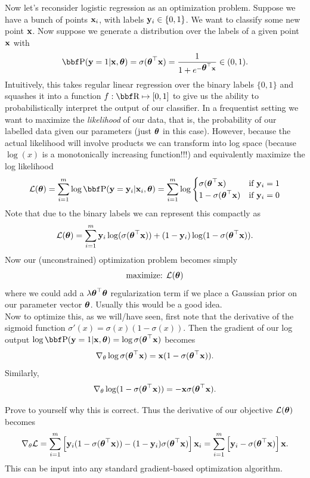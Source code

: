 \documentclass{article}
\begin{document}
Now let's reconsider logistic regression as an optimization problem.
Suppose we have a bunch of points ${\bf x}_i$, with labels ${\bf y}_i \in \{0,1\}$.
We want to classify some new point ${\bf x}$.
Now suppose we generate a distribution over the labels of a given point
${\bf x}$ with
\[
    \PP(\yy = 1 | \xx,\thetab) = \sigma(\thetab^\T\xx) = \frac{1}{1 + e^{-\thetab^\T\xx}} \in (0,1).
\]
Intuitively, this takes regular linear regression over the binary labels
$\{0,1\}$ and squashes it into a function $f : \RR \mapsto [0,1]$ to give
us the ability to probabilistically interpret the output of our classifier.
In a frequentist setting we want to maximize the \textit{likelihood} of our data,
that is, the probability of our labelled data given our parameters (just
$\hbox{\boldmath$\theta$}$ in this case). However, because the actual likelihood will involve
products we can transform into log space (because $\log(x)$ is a monotonically
increasing function!!!) and equivalently maximize the log likelihood
\[
    \Lc(\thetab) = \sum_{i=1}^m \log \PP(\yy=\yy_i | \xx_i, \thetab) = \sum_{i=1}^m \log \begin{cases}
        \sigma(\thetab^\T\xx) & \text{if $\yy_i=1$}\\
        1-\sigma(\thetab^\T\xx) & \text{if $\yy_i=0$}
    \end{cases}
\]
Note that due to the binary labels we can represent this compactly as
\[
    {\cal L}(\hbox{\boldmath$\theta$}) = \sum_{i=1}^m {\bf y}_i\log(\sigma(\hbox{\boldmath$\theta$}^\top{\bf x})) + (1-{\bf y}_i)\log(1-\sigma(\hbox{\boldmath$\theta$}^\top{\bf x})).
\]
Now our (unconstrained) optimization problem becomes simply
\begin{align*}
    \text{maximize: } {\cal L}(\hbox{\boldmath$\theta$})
\end{align*}
where we could add a $\lambda \hbox{\boldmath$\theta$}^\top\hbox{\boldmath$\theta$}$ regularization term if we place
a Gaussian prior on our parameter vector $\hbox{\boldmath$\theta$}$. Usually this would be a
good idea.\\

Now to optimize this, as we will/have seen, first note that the derivative of
the sigmoid function $\sigma'(x) = \sigma(x)\left(1-\sigma(x)\right)$. Then the
gradient of our log output $\log\PP(\yy=1|\xx,\thetab) = \log\sigma(\thetab^\T\xx)$
becomes
\[
    \nabla_\theta \log\sigma(\hbox{\boldmath$\theta$}^\top{\bf x}) = {\bf x}(1-\sigma(\hbox{\boldmath$\theta$}^\top{\bf x}) ).
\]
Similarly,
\[
    \nabla_\theta \log(1-\sigma(\hbox{\boldmath$\theta$}^\top{\bf x})) = -{\bf x}\sigma(\hbox{\boldmath$\theta$}^\top{\bf x}).
\]

Prove to yourself why this is correct. Thus the derivative of our objective ${\cal L}(\hbox{\boldmath$\theta$})$
becomes
\[
    \nabla_\theta {\cal L} = \sum_{i=1}^m \left[  {\bf y}_i(1-\sigma(\hbox{\boldmath$\theta$}^\top{\bf x})) - (1-{\bf y}_i)\sigma(\hbox{\boldmath$\theta$}^\top{\bf x})  \right]{\bf x}_i = \sum_{i=1}^m \left[ {\bf y}_i - \sigma(\hbox{\boldmath$\theta$}^\top{\bf x}) \right]{\bf x}.
\]
This can be input into any standard gradient-based optimization algorithm.\\
\end{document}
